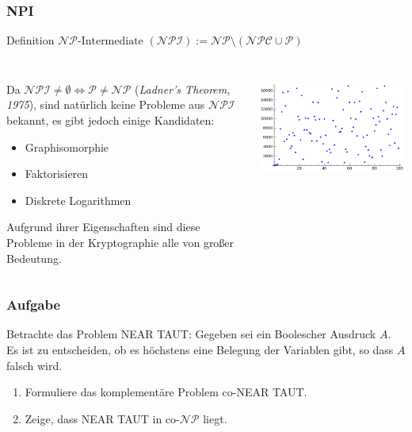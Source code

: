 \begin{frame}
\frametitle{NPI}
\begin{block}{Definition}
$\mathcal{NP}\text{-Intermediate } (\mathcal{NPI}) := \mathcal{NP} \setminus (\mathcal{NPC} \cup \mathcal{P})$
\end{block}
$$ $$ %

\begin{columns}%
		\begin{column}{0.6 \textwidth}%
			Da $\mathcal{NPI} \neq \emptyset \iff \mathcal{P} \neq \mathcal{NP}$ (\textit{Ladner's Theorem, 1975}), sind natürlich keine Probleme aus $\mathcal{NPI}$ bekannt, es gibt jedoch einige Kandidaten:
\begin{itemize}
	\item Graphisomorphie
	\item Faktorisieren
	\item Diskrete Logarithmen
	
\end{itemize}

Aufgrund ihrer Eigenschaften sind diese Probleme in der Kryptographie alle von großer Bedeutung.

		\end{column}%
		\begin{column}{0.35 \textwidth}%
	\ducttape{1cm} \includegraphics[scale=.3]{images/dlog.png}
		\end{column}%
	\end{columns}%
	\vfill%
\end{frame}


\begin{frame}
\frametitle{Aufgabe}
Betrachte das Problem NEAR TAUT: Gegeben sei ein Boolescher Ausdruck $A$. Es ist zu entscheiden, ob es höchstens eine Belegung der Variablen gibt, so dass $A$ falsch wird.
\begin{enumerate}
 \item Formuliere das komplementäre Problem co-NEAR TAUT.
 \item Zeige, dass NEAR TAUT in co-$\mathcal{NP}$ liegt.
\end{enumerate}
\end{frame}

